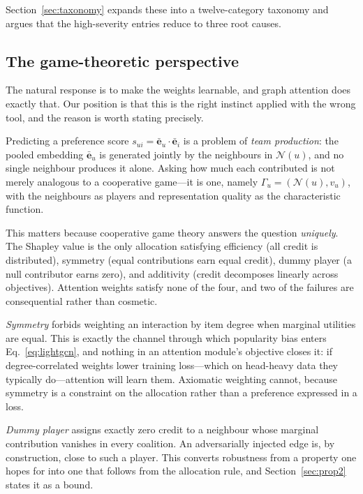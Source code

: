 \documentclass[final,5p,times,twocolumn]{elsarticle}
\begin{document}
Section~\ref{sec:taxonomy} expands these into a twelve-category taxonomy and
argues that the high-severity entries reduce to three root causes.

\subsection{The game-theoretic perspective}
\label{sec:perspective}

The natural response is to make the weights learnable, and graph attention
does exactly that. Our position is that this is the right instinct applied
with the wrong tool, and the reason is worth stating precisely.

Predicting a preference score $s_{ui} = \bar{\mathbf{e}}_u \cdot
\bar{\mathbf{e}}_i$ is a problem of \emph{team production}: the pooled
embedding $\bar{\mathbf{e}}_u$ is generated jointly by the neighbours in
$\mathcal{N}(u)$, and no single neighbour produces it alone. Asking how much
each contributed is not merely analogous to a cooperative game---it is one,
namely $\Gamma_u = (\mathcal{N}(u), v_u)$, with the neighbours as players and
representation quality as the characteristic function.

This matters because cooperative game theory answers the question
\emph{uniquely}. The Shapley value \citep{shapley1953value} is the only
allocation satisfying efficiency (all credit is distributed), symmetry
(equal contributions earn equal credit), dummy player (a null contributor
earns zero), and additivity (credit decomposes linearly across objectives).
Attention weights satisfy none of the four, and two of the failures are
consequential rather than cosmetic.

\emph{Symmetry} forbids weighting an interaction by item degree when marginal
utilities are equal. This is exactly the channel through which popularity bias
enters Eq.~\eqref{eq:lightgcn}, and nothing in an attention module's objective
closes it: if degree-correlated weights lower training loss---which on
head-heavy data they typically do---attention will learn them. Axiomatic
weighting cannot, because symmetry is a constraint on the allocation rather
than a preference expressed in a loss.

\emph{Dummy player} assigns exactly zero credit to a neighbour whose marginal
contribution vanishes in every coalition. An adversarially injected edge is,
by construction, close to such a player. This converts robustness from a
property one hopes for into one that follows from the allocation rule, and
Section~\ref{sec:prop2} states it as a bound.
\end{document}
